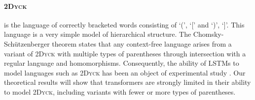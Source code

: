 \documentclass[11pt,a4paper]{article}
\newcounter{theorem}
\begin{document}
\paragraph{\textsc{2Dyck}} is the language of correctly bracketed words consisting of `(', `[' and `)', `]'.
This language is a very simple model of hierarchical structure.
The Chomsky-Sch{\"u}tzenberger theorem \cite{chomsky1963algebraic} states that any context-free language arises from a variant of \textsc{2Dyck} with multiple types of parentheses through intersection with a regular language and homomorphisms.
Consequently, the ability of LSTMs to model languages such as \textsc{2Dyck} has been an object of experimental study \cite{sennhauser2018evaluating,skachkova2018closing,bernardy2018can}.
Our theoretical results will show that transformers are strongly limited in their ability to model \textsc{2Dyck}, including variants with fewer or more types of parentheses.






\end{document}
